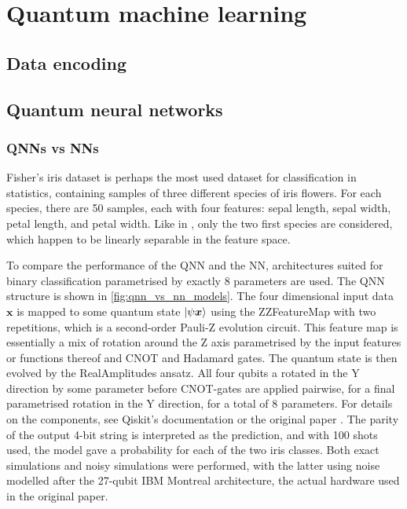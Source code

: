 \chapter{Quantum machine learning}

\section{Data encoding}

\section{Quantum neural networks}

\subsection{QNNs vs NNs}
Fisher's iris dataset is perhaps the most used dataset for classification in statistics, containing samples of three different species of iris flowers. For each species, there are 50 samples, each with four features: sepal length, sepal width, petal length, and petal width. Like in \cite{abbas2021}, only the two first species are considered, which happen to be linearly separable in the feature space.

To compare the performance of the QNN and the NN, architectures suited for binary classification parametrised by exactly 8 parameters are used. The QNN structure is shown in \cref{fig:qnn_vs_nn_models}. The four dimensional input data $\bm{x}$ is mapped to some quantum state $\ket{\psi{\bm{x}}}$ using the ZZFeatureMap with two repetitions, which is a second-order Pauli-Z evolution circuit. This feature map is essentially a mix of rotation around the Z axis parametrised by the input features or functions thereof and CNOT and Hadamard gates. The quantum state is then evolved by the RealAmplitudes ansatz. All four qubits a rotated in the Y direction by some parameter before CNOT-gates are applied pairwise, for a final parametrised rotation in the Y direction, for a total of 8 parameters. For details on the components, see Qiskit's documentation \cite{qiskit} or the original paper \cite{abbas2021}. The parity of the output 4-bit string is interpreted as the prediction, and with 100 shots used, the model gave a probability for each of the two iris classes. Both exact simulations and noisy simulations were performed, with the latter using noise modelled after the 27-qubit IBM Montreal architecture, the actual hardware used in the original paper.

